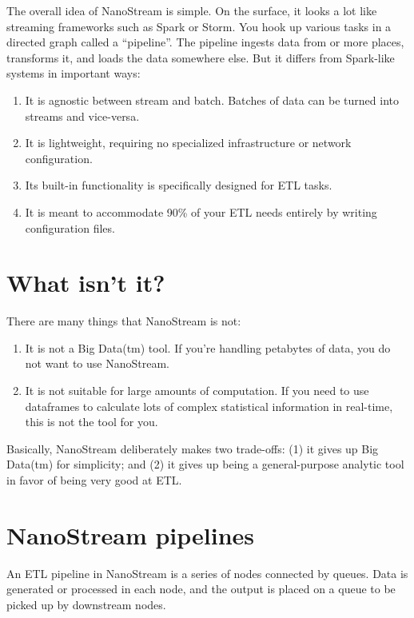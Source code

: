 \documentclass[letterpaper,10pt,english]{sphinxmanual}
\begin{document}
The overall idea of NanoStream is simple. On the surface, it looks a lot like streaming frameworks such as Spark or Storm. You hook up various tasks in a directed graph called a “pipeline”. The pipeline ingests data from or more places, transforms it, and loads the data somewhere else. But it differs from Spark-like systems in important ways:
\begin{enumerate}
\def\theenumi{\arabic{enumi}}
\def\labelenumi{\theenumi .}
\makeatletter\def\p@enumii{\p@enumi \theenumi .}\makeatother
\item {} 
It is agnostic between stream and batch. Batches of data can be turned into streams and vice-versa.

\item {} 
It is lightweight, requiring no specialized infrastructure or network configuration.

\item {} 
Its built-in functionality is specifically designed for ETL tasks.

\item {} 
It is meant to accommodate 90\% of your ETL needs entirely by writing configuration files.

\end{enumerate}


\section{What isn’t it?}
\label{\detokenize{overview:what-isn-t-it}}
There are many things that NanoStream is not:
\begin{enumerate}
\def\theenumi{\arabic{enumi}}
\def\labelenumi{\theenumi .}
\makeatletter\def\p@enumii{\p@enumi \theenumi .}\makeatother
\item {} 
It is not a Big Data(tm) tool. If you’re handling petabytes of data, you do
not want to use NanoStream.

\item {} 
It is not suitable for large amounts of computation. If you need to use
dataframes to calculate lots of complex statistical information in real-time,
this is not the tool for you.

\end{enumerate}

Basically, NanoStream deliberately makes two trade-offs: (1) it gives up Big Data(tm) for simplicity; and (2) it gives up being a general-purpose analytic tool in favor of being very good at ETL.


\section{NanoStream pipelines}
\label{\detokenize{overview:nanostream-pipelines}}
An ETL pipeline in NanoStream is a series of nodes connected by queues. Data
is generated or processed in each node, and the output is placed on a queue to
be picked up by downstream nodes.
\end{document}
